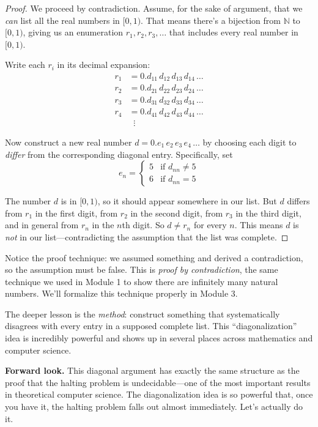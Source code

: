\documentclass[11pt]{article}
\begin{document}
\begin{proof}
We proceed by contradiction. Assume, for the sake of argument, that we \emph{can} list all the real numbers in $[0,1)$. That means there's a bijection from $\mathbb{N}$ to $[0,1)$, giving us an enumeration $r_1, r_2, r_3, \ldots$ that includes every real number in $[0,1)$.

Write each $r_i$ in its decimal expansion:
\begin{align*}
r_1 &= 0.d_{11}\, d_{12}\, d_{13}\, d_{14}\, \ldots \\
r_2 &= 0.d_{21}\, d_{22}\, d_{23}\, d_{24}\, \ldots \\
r_3 &= 0.d_{31}\, d_{32}\, d_{33}\, d_{34}\, \ldots \\
r_4 &= 0.d_{41}\, d_{42}\, d_{43}\, d_{44}\, \ldots \\
&\;\;\vdots
\end{align*}

Now construct a new real number $d = 0.e_1\, e_2\, e_3\, e_4\, \ldots$ by choosing each digit to \emph{differ} from the corresponding diagonal entry. Specifically, set
\[
e_n = \begin{cases} 5 & \text{if } d_{nn} \neq 5 \\ 6 & \text{if } d_{nn} = 5 \end{cases}
\]

The number $d$ is in $[0,1)$, so it should appear somewhere in our list. But $d$ differs from $r_1$ in the first digit, from $r_2$ in the second digit, from $r_3$ in the third digit, and in general from $r_n$ in the $n$th digit. So $d \neq r_n$ for every $n$. This means $d$ is \emph{not} in our list---contradicting the assumption that the list was complete.
\end{proof}

Notice the proof technique: we assumed something and derived a contradiction, so the assumption must be false. This is \emph{proof by contradiction}, the same technique we used in Module 1 to show there are infinitely many natural numbers. We'll formalize this technique properly in Module 3.

The deeper lesson is the \emph{method}: construct something that systematically disagrees with every entry in a supposed complete list. This ``diagonalization'' idea is incredibly powerful and shows up in several places across mathematics and computer science.

\medskip
\noindent\textbf{Forward look.} This diagonal argument has exactly the same structure as the proof that the halting problem is undecidable---one of the most important results in theoretical computer science. The diagonalization idea is so powerful that, once you have it, the halting problem falls out almost immediately. Let's actually do it.
\end{document}
